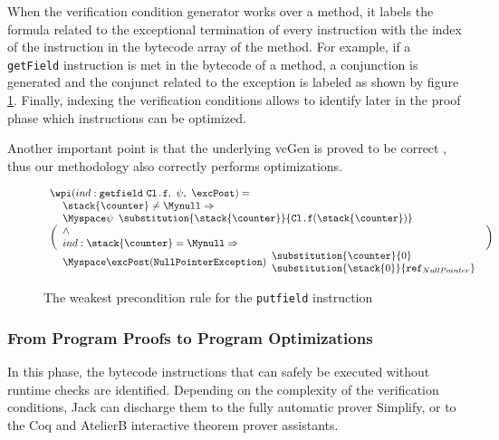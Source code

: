 When the verification condition generator works over a method, it labels the formula related to the exceptional termination of every instruction with the index of the instruction in the bytecode array of the method. For example, if a \texttt{getField} instruction is met in the bytecode of a method, a conjunction is generated and the conjunct related to the exception is labeled as shown by figure \ref{fig:wpRule}. Finally, indexing the verification conditions allows to identify later in the proof phase which instructions can be optimized.

Another important point is that the underlying vcGen is proved to be correct \cite{JBL05MP}, thus our methodology also correctly performs optimizations.

\begin{figure}
\[
\begin{array}{l}
\wpi(ind : \texttt{getfield} \ \texttt{Cl.f}, \ \psi, \ \excPost) = \\
\biggl( 
\begin{array}{l}
   		\stack{\counter} \not= \Mynull\Rightarrow   \\
	\Myspace \psi\begin{array}{l} \substitution{\stack{\counter}}{\texttt{Cl.f} (\stack{ \counter}) } \\[0 mm]

		\end{array}\\
   \wedge \\
    ind : \stack{\counter} = \Mynull 	\Rightarrow\\
   \Myspace	 \excPost(\texttt{NullPointerException})
        \begin{array}{l}
          \substitution{ \counter }{ 0} \\
          \substitution{\stack{0}}{ \texttt{ref}_{NullPointer} }
	\end{array}
    \end{array} \biggr)
\end{array}
 \]
\caption{The weakest precondition rule for the \texttt{putfield} instruction}
\label{fig:wpRule}
\end{figure}

\subsubsection{From Program Proofs to Program Optimizations }
\label{proofs}
In this phase, the bytecode instructions that can safely be executed without runtime checks are identified. Depending on the complexity of the verification conditions, Jack can discharge them to the fully automatic prover Simplify, or to the Coq and AtelierB interactive theorem prover assistants.


